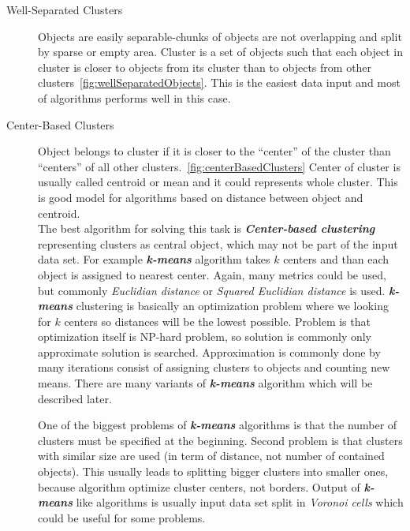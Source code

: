\begin{description}
\item[Well-Separated Clusters] Objects are easily separable-chunks of objects are not overlapping and split by sparse or empty area. Cluster is a set of objects such that each object in cluster is closer to objects from its cluster than to objects from other clusters~\autoref{fig:wellSeparatedObjects}. This is the easiest data input and most of algorithms performs well in this case.

\item[Center-Based Clusters] Object belongs to cluster if it is closer to the ``center'' of the cluster than ``centers'' of all other clusters.~\autoref{fig:centerBasedClusters} Center of cluster is usually called centroid or mean and it could represents whole cluster. This is good model for algorithms based on distance between object and centroid. \\
The best algorithm for solving this task is \textit{\textbf{Center-based clustering}} representing clusters as central object, which may not be part of the input data set.  For example \textit{\textbf{k-means}} algorithm takes $k$ centers and than each object is assigned to nearest center. Again, many metrics could be used, but commonly \textit{Euclidian distance} or \textit{Squared Euclidian distance} is used. \textit{\textbf{k-means}} clustering is basically an optimization problem where we looking for $k$ centers so distances will be the lowest possible. Problem is that optimization itself is NP-hard problem, so solution is commonly only approximate solution is searched. Approximation is commonly done by many iterations consist of assigning clusters to objects and  counting new means.
There are many variants of \textit{\textbf{k-means}} algorithm which will be described later. %

One of the biggest problems of \textit{\textbf{k-means}} algorithms is that the number of clusters must be specified at the beginning. Second problem is that clusters with similar size are used (in term of distance, not number of contained objects). This usually leads to splitting bigger clusters into smaller ones, because algorithm optimize cluster centers, not borders.
Output of \textit{\textbf{k-means}} like algorithms is usually input data set split in \textit{Voronoi cells} which could be useful for some problems.


\end{description}
